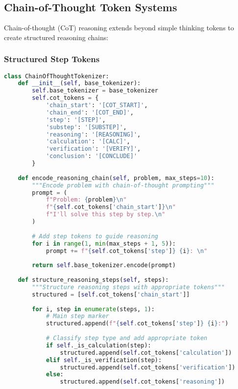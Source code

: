 \subsection{Chain-of-Thought Token Systems}

Chain-of-thought (CoT) reasoning extends beyond simple thinking tokens to create structured reasoning chains:

\subsubsection{Structured Step Tokens}

\begin{lstlisting}[language=Python, caption=Chain-of-thought step tokenization]
class ChainOfThoughtTokenizer:
    def __init__(self, base_tokenizer):
        self.base_tokenizer = base_tokenizer
        self.cot_tokens = {
            'chain_start': '[COT_START]',
            'chain_end': '[COT_END]',
            'step': '[STEP]',
            'substep': '[SUBSTEP]',
            'reasoning': '[REASONING]',
            'calculation': '[CALC]',
            'verification': '[VERIFY]',
            'conclusion': '[CONCLUDE]'
        }
        
    def encode_reasoning_chain(self, problem, max_steps=10):
        """Encode problem with chain-of-thought prompting"""
        prompt = (
            f"Problem: {problem}\n"
            f"{self.cot_tokens['chain_start']}\n"
            f"I'll solve this step by step.\n"
        )
        
        # Add step tokens to guide reasoning
        for i in range(1, min(max_steps + 1, 5)):
            prompt += f"{self.cot_tokens['step']} {i}: \n"
        
        return self.base_tokenizer.encode(prompt)
    
    def structure_reasoning_steps(self, steps):
        """Structure reasoning steps with appropriate tokens"""
        structured = [self.cot_tokens['chain_start']]
        
        for i, step in enumerate(steps, 1):
            # Main step marker
            structured.append(f"{self.cot_tokens['step']} {i}:")
            
            # Classify step type and add appropriate token
            if self._is_calculation(step):
                structured.append(self.cot_tokens['calculation'])
            elif self._is_verification(step):
                structured.append(self.cot_tokens['verification'])
            else:
                structured.append(self.cot_tokens['reasoning'])
            

\end{lstlisting}
